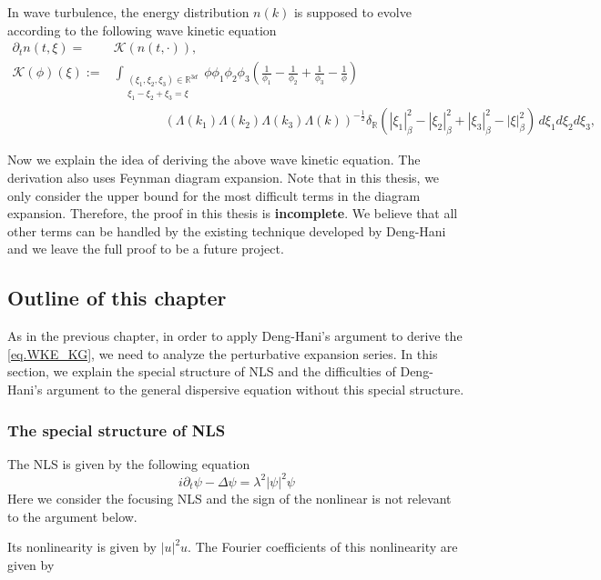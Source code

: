In wave turbulence, the energy distribution $n(k)$ is supposed to evolve according to the following wave kinetic equation
\[
\tag{WKE}\label{eq.WKE_KG}
\begin{split}
\partial_t n(t, \xi) =&\mathcal K\left(n(t, \cdot)\right), \\
\mathcal K(\phi)(\xi):=& \int_{\substack{(\xi_1, \xi_2, \xi_3)\in \mathbb{R}^{3d}\\\xi_1-\xi_2+\xi_3=\xi}} \phi \phi_1 \phi_2 \phi_3\left(\frac{1}{\phi_1}-\frac{1}{\phi_2}+\frac{1}{\phi_3}-\frac{1}{\phi}\right)
\\
&\qquad\qquad(\Lambda(k_1)\Lambda(k_2)\Lambda(k_3)\Lambda(k))^{-\frac{1}{2}}\delta_{\mathbb{R}}(|\xi_1|_\beta^2-|\xi_2|_\beta^2+|\xi_3|_\beta^2-|\xi|_\beta^2)\, d\xi_1 d\xi_2 d\xi_3,
\end{split}
\]


Now we explain the idea of deriving the above wave kinetic equation. The derivation also uses Feynman diagram expansion. Note that in this thesis, we only consider the upper bound for the most difficult terms in the diagram expansion. Therefore, the proof in this thesis is \textbf{incomplete}. We believe that all other terms can be handled by the existing technique developed by Deng-Hani \cite{} and we leave the full proof to be a future project.





\subsection{Outline of this chapter} As in the previous chapter, in order to apply Deng-Hani's argument to derive the \eqref{eq.WKE_KG}, we need to analyze the perturbative expansion series. In this section, we explain the special structure of NLS and the difficulties of Deng-Hani's argument to the general dispersive equation without this special structure. 

\subsubsection{The special structure of NLS}\label{sec.specialintro} The NLS is given by the following equation
\begin{equation}
 i\partial_t\psi-\Delta\psi=\lambda^2 |\psi|^2\psi
\end{equation}
Here we consider the focusing NLS and the sign of the nonlinear is not relevant to the argument below.

Its nonlinearity is given by $|u|^2u$. The Fourier coefficients of this nonlinearity are given by

